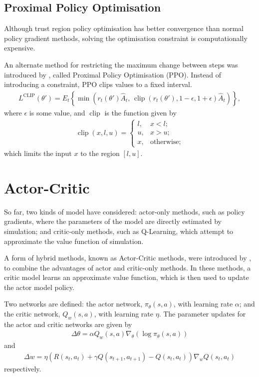 \newpage
\subsection{Proximal Policy Optimisation}

Although trust region policy optimisation has better convergence than normal
policy gradient methods, solving the optimisation constraint is computationally
expensive.

An alternate method for restricting the maximum change between steps was
introduced by \cite{Schulman:2017:Proximal}, called Proximal Policy
Optimisation (PPO).
Instead of introducing a constraint, PPO clips values to a fixed interval.
\begin{align*}
    L^\text{CLIP}(\theta') = E_t\left\{ \min\left(
        r_t(\theta')\hat{A}_t,\,
        \operatorname{clip} (r_t(\theta'), 1 - \epsilon, 1 + \epsilon)\hat{A}_t
    \right) \right\},
\end{align*}
where $\epsilon$ is some value, and $\operatorname{clip}$ is the function given
by
\begin{align*}
    \operatorname{clip}(x,l,u) = \begin{cases}
        l, & x < l;\\
        u, & x > u;\\
        x, & \text{otherwise};
    \end{cases}
\end{align*}
which limits the input $x$ to the region $[l,u]$.



\section{Actor-Critic}

So far, two kinds of model have considered:
actor-only methods, such as policy gradients, where the parameters of the model
are directly estimated by simulation;
and critic-only methods, such as Q-Learning, which attempt to approximate the
value function of simulation.

A form of hybrid methods, known as Actor-Critic methods, were introduced by
\cite{Konda:2000:Actor}, to combine the advantages of actor and critic-only
methods.
In these methods, a critic model learns an approximate value function, which is
then used to update the actor model policy.

Two networks are defined:
the actor network, $\pi_\theta(s,a)$, with learning rate $\alpha$;
and the critic network, $Q_w(s,a)$, with learning rate $\eta$.
The parameter updates for the actor and critic networks are given by
\begin{align*}
    \Delta\theta = \alpha Q_w(s,a)\nabla_\theta(\log\pi_\theta(s,a))
\end{align*}
and
\begin{align*}
    \Delta w = \eta (R(s_t,a_t) + \gamma Q(s_{t+1},a_{t+1}) - Q(s_t,a_t))\nabla_wQ(s_t,a_t)
\end{align*}
respectively.

